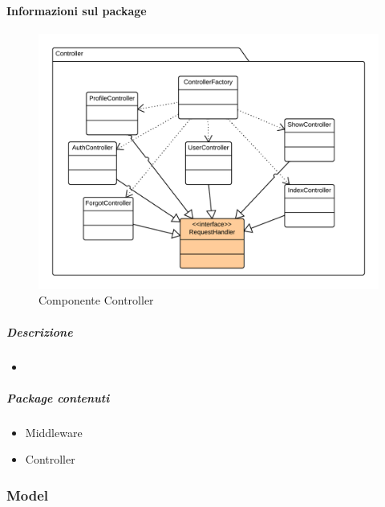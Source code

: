   \paragraph{Informazioni sul package} 
    \begin{figure}[H] 
      \begin{center} 
        \includegraphics[width=\textwidth]{packages/Back-end::Lib::Controller.png}  
        \caption{Componente Controller}
      \end{center}  
    \end{figure} 
  \subparagraph{Descrizione} 
    \begin{itemize}
    \item[] 
    \end{itemize} 
    \subparagraph{Package contenuti} 
    \begin{itemize}
        \item Middleware
        \item Controller
    \end{itemize}
  \subsubsection{Model}
